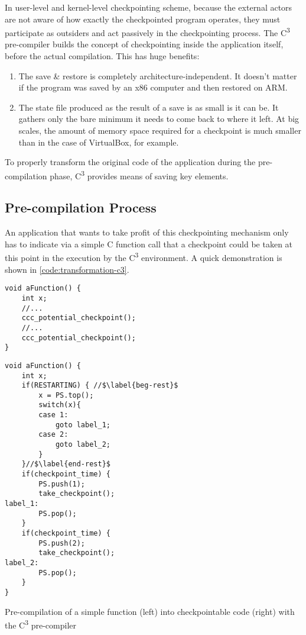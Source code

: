 In user-level and kernel-level checkpointing scheme, because the external actors are not aware of how exactly the checkpointed program operates, they must participate as outsiders and act passively in the checkpointing process. The C\textsuperscript{3} pre-compiler builds the concept of checkpointing inside the application itself, before the actual compilation. This has huge benefits:
\begin{enumerate}
	\item The save \& restore is completely architecture-independent. It doesn't matter if the program was saved by an x86 computer and then restored on ARM.
	\item The state file produced as the result of a save is as small is it can be. It gathers only the bare minimum it needs to come back to where it left. At big scales, the amount of memory space required for a checkpoint is much smaller than in the case of VirtualBox, for example.
\end{enumerate}

To properly transform the original code of the application during the pre-compilation phase, C\textsuperscript{3} provides means of saving key elements.

\subsection*{Pre-compilation Process}
An application that wants to take profit of this checkpointing mechanism only has to indicate via a simple C function call that a checkpoint could be taken at this point in the execution by the C\textsuperscript{3} environment. A quick demonstration is shown in \autoref{code:transformation-c3}.

\begin{listing}[htpb]
\centering
\begin{minipage}{.5\textwidth}
\begin{verbatim}
void aFunction() {
	int x;
	//...
	ccc_potential_checkpoint();
	//...
	ccc_potential_checkpoint();
}
\end{verbatim}
\centering

\end{minipage}%
\begin{minipage}{.5\textwidth}
\begin{verbatim}
void aFunction() {
	int x;
	if(RESTARTING) { //$\label{beg-rest}$
		x = PS.top();
		switch(x){
		case 1: 
			goto label_1;
		case 2: 
			goto label_2;
		}
	}//$\label{end-rest}$
	if(checkpoint_time) {
		PS.push(1);
		take_checkpoint();
label_1:
		PS.pop();
	}
	if(checkpoint_time) {
		PS.push(2);
		take_checkpoint();
label_2:
		PS.pop();
	}
}
\end{verbatim}
\end{minipage}
\caption{Pre-compilation of a simple function (left) into checkpointable code (right) with the C\textsuperscript{3} pre-compiler\cite{online:c3-ppt}}
\label{code:transformation-c3}
\end{listing}

